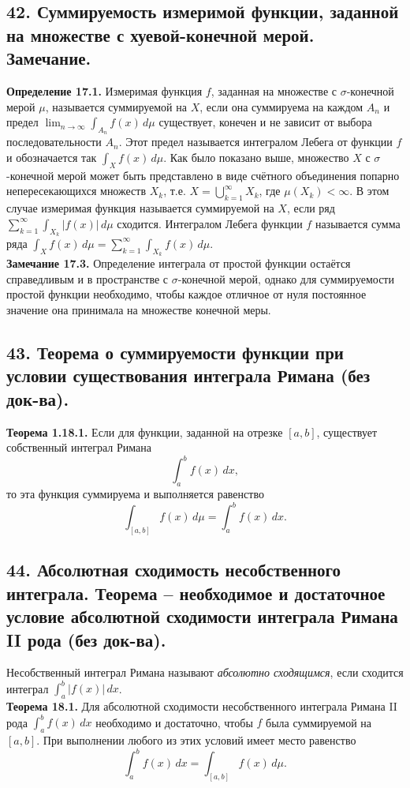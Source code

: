 \documentclass[12pt]{article}
\begin{document}
\subsection*{42. Суммируемость измеримой функции, заданной на множестве с хуевой-конечной мерой.
Замечание.}
\textbf{Определение 17.1.} Измеримая функция $f$, заданная на множестве с $\sigma$-конечной мерой $\mu$, называется суммируемой на $X$, если она суммируема на каждом $A_n$ и предел $\lim_{n \to \infty} \int_{A_n} f(x)\,d\mu$ существует, конечен и не зависит от выбора последовательности $A_n$. Этот предел называется интегралом Лебега от функции $f$ и обозначается так $\int_X f(x)\,d\mu$. Как было показано выше, множество $X$ с $\sigma$-конечной мерой может быть представлено в виде счётного объединения попарно непересекающихся множеств $X_k$, т.е. $X = \bigcup_{k=1}^\infty X_k$, где $\mu(X_k) < \infty$. В этом случае измеримая функция называется суммируемой на $X$, если ряд $\sum_{k=1}^\infty \int_{X_k} |f(x)|\,d\mu$ сходится. Интегралом Лебега функции $f$ называется сумма ряда $\int_X f(x)\,d\mu = \sum_{k=1}^\infty \int_{X_k} f(x)\,d\mu$. \\\textbf{Замечание 17.3.} Определение интеграла от простой функции остаётся справедливым и в пространстве с $\sigma$-конечной мерой, однако для суммируемости простой функции необходимо, чтобы каждое отличное от нуля постоянное значение она принимала на множестве конечной меры.

\subsection*{43. Теорема о суммируемости функции при условии существования интеграла Римана
(без док-ва).}
\textbf{Теорема 1.18.1.} Если для функции, заданной на отрезке $[a,b]$, существует собственный интеграл Римана \[ \int_a^b f(x)\,dx, \] то эта функция суммируема и выполняется равенство \[ \int_{[a,b]} f(x)\,d\mu = \int_a^b f(x)\,dx. \]

\subsection*{44. Абсолютная сходимость несобственного интеграла. Теорема – необходимое и
достаточное условие абсолютной сходимости интеграла Римана II рода (без док-ва).}
Несобственный интеграл Римана называют \textit{абсолютно сходящимся}, если сходится интеграл $\int_a^b |f(x)|\,dx$. \\\textbf{Теорема 18.1.} Для абсолютной сходимости несобственного интеграла Римана II рода $\int_a^b f(x)\,dx$ необходимо и достаточно, чтобы $f$ была суммируемой на $[a,b]$. При выполнении любого из этих условий имеет место равенство \[ \int_a^b f(x)\,dx = \int_{[a,b]} f(x)\,d\mu. \]
\end{document}
